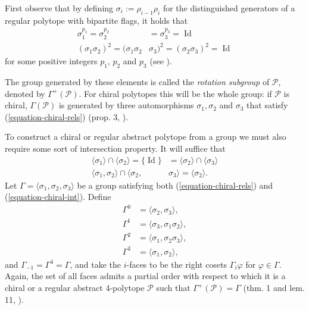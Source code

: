 First observe that by defining
$\sigma_i:=\rho_{i-1}\rho_i$ for the
distinguished generators of a regular
polytope with bipartite flags, it holds that
\begin{equation}
\label{equation-chiral-rels}
\begin{aligned}
\sigma_1^{p_1}=\sigma_2^{p_2}
&=\sigma_3^{p_3}=\operatorname{Id}\\
(\sigma_1\sigma_2)^2
=(\sigma_1\sigma_2&\sigma_3)^2
=(\sigma_2\sigma_3)^2=\operatorname{Id}
\end{aligned}
\end{equation}
for some positive integers $p_1$, $p_2$ and
$p_3$ (see \cite{schulte-chiral}).

The group generated by these elements is
called the \textit{rotation subgroup} of
$\mathcal{P}$, denoted by
$\Gamma^+(\mathcal{P})$. For chiral polytopes
this will be the whole group: if
$\mathcal{P}$ is chiral,
$\Gamma(\mathcal{P})$ is generated by three
automorphisms $\sigma_1,\sigma_2$ and
$\sigma_3$ that satisfy
(\ref{equation-chiral-rels}) (prop. 3,
\cite{schulte-chiral}).

To construct a chiral or regular abstract
polytope from a group we must also require
some sort of intersection property. It will
suffice that
\begin{equation}
\label{equation-chiral-int}
\begin{aligned}
\langle\sigma_1\rangle\cap
\langle\sigma_2\rangle=\{\operatorname{Id}\}
&=\langle\sigma_2\rangle\cap
\langle\sigma_3\rangle\\
\langle\sigma_1,\sigma_2\rangle\cap
\langle\sigma_2,&\sigma_3\rangle
=\langle\sigma_2\rangle.
\end{aligned}
\end{equation}
Let $\Gamma=\langle
\sigma_1,\sigma_2,\sigma_3\rangle$ be a group
satisfying both (\ref{equation-chiral-rels})
and (\ref{equation-chiral-int}). Define
$$
\begin{aligned}
\Gamma^0&=\langle\sigma_2,\sigma_3\rangle,\\
\Gamma^1&=\langle \sigma_3,\sigma_1\sigma_2\rangle,\\
\Gamma^2&=\langle \sigma_1,\sigma_2\sigma_3\rangle,\\
\Gamma^3&=\langle \sigma_1,\sigma_2\rangle,
\end{aligned}
$$
and $\Gamma_{-1}=\Gamma^4=\Gamma$, and take
the $i$-faces to be the right cosets
$\Gamma_i\varphi$ for $\varphi\in\Gamma$.
Again, the set of all faces admits a partial
order with respect to which it is a chiral or
a regular abstract 4-polytope $\mathcal{P}$
such that $\Gamma^+(\mathcal{P})=\Gamma$
(thm. 1 and lem. 11, \cite{schulte-chiral}).

